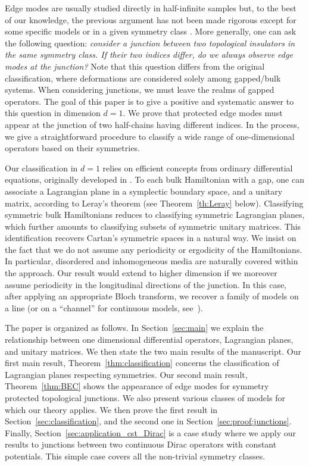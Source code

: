 \documentclass[11pt]{amsart}
\numberwithin{equation}{section} %
\newcommand\1{{\mathds 1}}
\begin{document}
Edge modes are usually studied directly in half-infinite samples but, to the best of our knowledge,  the previous argument has not been made rigorous except for some specific models or in a given symmetry class \cite{GraPor-13, Dro-21,Bal-22,BalBecDro-23,RosTar-24, Bal-}. More generally, one can ask the following question: {\em consider a junction between two topological insulators in the same symmetry class. If their two indices differ, do we always observe edge modes at the junction?} Note that this question differs from the original classification, where deformations are considered solely among gapped/bulk systems. When considering junctions, we must leave the realms of gapped operators. The goal of this paper is to give a positive and systematic answer to this question in dimension $d = 1$. We prove that protected edge modes must appear at the junction of two half-chains having different indices. In the process, we give a straightforward procedure to classify a wide range of one-dimensional operators based on their symmetries.

\medskip

Our classification in $d=1$ relies on efficient concepts from ordinary differential equations, originally developed in \cite{Gon-20, Gon-23}. To each bulk Hamiltonian with a gap, one can associate a Lagrangian plane in a symplectic boundary space, and a unitary matrix, according to Leray's theorem \cite{Ler-78} (see Theorem~\ref{th:Leray} below). Classifying symmetric bulk Hamiltonians reduces to classifying symmetric Lagrangian planes, which further amounts to classifying subsets of symmetric unitary matrices. This identification recovers Cartan's symmetric spaces in a natural way. We insist on the fact that we do not assume any periodicity or ergodicity of the Hamiltonians. In particular, disordered and inhomogeneous media are naturally covered within the approach. Our result would extend to higher dimension if we moreover assume periodicity in the longitudinal directions of the junction. In this case, after applying an appropriate Bloch transform, we recover a family of models on a line (or on a ``channel'' for continuous models, see~\cite{Gon-23}). 

\bigskip

The paper is organized as follows. In Section~\ref{sec:main} we explain the relationship between one dimensional differential operators, Lagrangian planes, and unitary matrices. We then state the two main results of the manuscript. Our first main result, Theorem~\ref{thm:classification} concerns the classification of Lagrangian planes respecting symmetries. Our second main result, Theorem~\ref{thm:BEC} shows the appearance of edge modes for symmetry protected topological junctions. We also present various classes of models for which our theory applies. We then prove the first result in Section~\ref{sec:classification}, and the second one in Section~\ref{sec:proof:junctions}. Finally, Section~\ref{sec:application_cst_Dirac} is a case study where we apply our results to junctions between two continuous Dirac operators with constant potentials. This simple case covers all the non-trivial symmetry classes.
\end{document}
